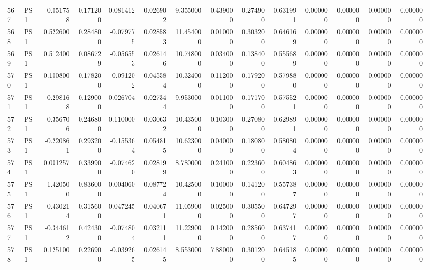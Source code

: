 \begin{tabular}{llrrrrrrrrrrrr}
567 &    PS1 & -0.051758 &      0.171200 &  0.081412 &    0.026902 &   9.355000 &      0.439000 &   0.274900 &  0.631991 &  0.000000 &   0.000000 &     0.000000 &     0.000000 \\
568 &    PS1 &  0.522600 &      0.284800 & -0.079775 &    0.028583 &  11.454000 &      0.010000 &   0.303200 &  0.646169 &  0.000000 &   0.000000 &     0.000000 &     0.000000 \\
569 &    PS1 &  0.512400 &      0.086729 & -0.056553 &    0.026146 &  10.748000 &      0.034000 &   0.138400 &  0.555689 &  0.000000 &   0.000000 &     0.000000 &     0.000000 \\
570 &    PS1 &  0.100800 &      0.178200 & -0.091202 &    0.045584 &  10.324000 &      0.112000 &   0.179200 &  0.579880 &  0.000000 &   0.000000 &     0.000000 &     0.000000 \\
571 &    PS1 & -0.298168 &      0.129000 &  0.026704 &    0.027344 &   9.953000 &      0.011000 &   0.171700 &  0.575521 &  0.000000 &   0.000000 &     0.000000 &     0.000000 \\
572 &    PS1 & -0.356706 &      0.246800 &  0.110000 &    0.030632 &  10.435000 &      0.103000 &   0.270800 &  0.629891 &  0.000000 &   0.000000 &     0.000000 &     0.000000 \\
573 &    PS1 & -0.220861 &      0.293200 & -0.155364 &    0.054815 &  10.623000 &      0.040000 &   0.180800 &  0.580804 &  0.000000 &   0.000000 &     0.000000 &     0.000000 \\
574 &    PS1 &  0.001257 &      0.339900 & -0.074620 &    0.028199 &   8.780000 &      0.241000 &   0.223600 &  0.604863 &  0.000000 &   0.000000 &     0.000000 &     0.000000 \\
575 &    PS1 & -1.420500 &      0.836000 &  0.004060 &    0.087724 &  10.425000 &      0.100000 &   0.141200 &  0.557387 &  0.000000 &   0.000000 &     0.000000 &     0.000000 \\
576 &    PS1 & -0.430214 &      0.315600 &  0.047245 &    0.040671 &  11.059000 &      0.025000 &   0.305500 &  0.647297 &  0.000000 &   0.000000 &     0.000000 &     0.000000 \\
577 &    PS1 & -0.344612 &      0.424300 & -0.074804 &    0.032111 &  11.229000 &      0.142000 &   0.285600 &  0.637417 &  0.000000 &   0.000000 &     0.000000 &     0.000000 \\
578 &    PS1 &  0.125100 &      0.226900 & -0.039265 &    0.026145 &   8.553000 &      7.880000 &   0.301200 &  0.645185 &  0.000000 &   0.000000 &     0.000000 &     0.000000 \\

\end{tabular}
